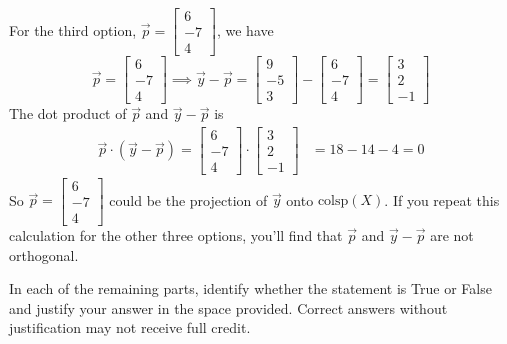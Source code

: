 \documentclass[11pt]{article}
\begin{document}
\begin{prob}[(13 pts)]
\begin{subprob}
\begin{solution}
For the third option, $\vec p = \begin{bmatrix} 6 \\ -7 \\ 4 \end{bmatrix}$, we have
\[
\vec p = \begin{bmatrix} 6 \\ -7 \\ 4 \end{bmatrix} \implies
\vec y - \vec p = \begin{bmatrix} 9 \\ -5 \\ 3 \end{bmatrix} - \begin{bmatrix} 6 \\ -7 \\ 4 \end{bmatrix} = \begin{bmatrix} 3 \\ 2 \\ -1 \end{bmatrix}
\]
The dot product of $\vec p$ and $\vec y - \vec p$ is
\begin{align*}
\vec p \cdot (\vec y - \vec p) = \begin{bmatrix} 6 \\ -7 \\ 4 \end{bmatrix} \cdot \begin{bmatrix} 3 \\ 2 \\ -1 \end{bmatrix}
&= 18 - 14 - 4 = 0
\end{align*}
So $\vec p = \begin{bmatrix} 6 \\ -7 \\ 4 \end{bmatrix}$ could be the projection of $\vec y$ onto $\text{colsp}(X)$. If you repeat this calculation for the other three options, you'll find that $\vec p$ and $\vec y - \vec p$ are not orthogonal.
\end{solution}
\end{subprob}


In each of the remaining parts, identify whether the statement is True or False and justify your answer in the space provided. Correct answers without justification may not receive full credit.


\end{prob}
\end{document}
